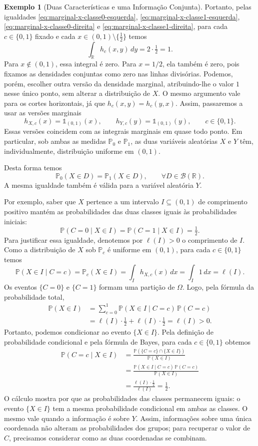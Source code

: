 \documentclass[12pt,portuguese]{article}
\theoremstyle{definition}
\newtheorem{example}[example]{Exemplo}
\theoremstyle{plainexercise}
\theoremstyle{starredexercise}
\theoremstyle{definition}
\begin{document}
\begin{example}[Duas Características e uma Informação Conjunta]
Portanto, pelas igualdades \eqref{eq:marginal-x-classe0-esquerda},
\eqref{eq:marginal-x-classe1-esquerda}, \eqref{eq:marginal-x-classe0-direita}
e \eqref{eq:marginal-x-classe1-direita}, para cada $c\in\{0,1\}$ fixado e
cada $x\in(0,1)\setminus\{\tfrac{1}{2}\}$ temos
\[
  \int_{\mathbb{R}}h_c(x,y)\,dy=2\cdot\tfrac{1}{2}=1.
\]
Para $x\notin(0,1)$, essa integral é zero. Para $x=1/2$, ela também é
zero, pois fixamos as densidades conjuntas como zero nas linhas divisórias.
Podemos, porém, escolher outra versão da densidade marginal, atribuindo-lhe
o valor $1$ nesse único ponto, sem alterar a distribuição de $X$.
O mesmo argumento vale para os cortes horizontais, já que
$h_c(x,y)=h_c(y,x)$. Assim, passaremos a usar as versões marginais
\[
  h_{X,c}(x)=\mathds{1}_{(0,1)}(x),
  \qquad
  h_{Y,c}(y)=\mathds{1}_{(0,1)}(y),
  \qquad c\in\{0,1\}.
\]
Essas versões coincidem com as integrais marginais em quase todo ponto.
Em particular, sob ambas as medidas $\mathbb{P}_0$ e $\mathbb{P}_1$,
as duas variáveis aleatórias $X$ e $Y$ têm, individualmente, distribuição uniforme em $(0,1)$.

Desta forma temos
\[
\mathbb{P}_0(X\in D)=\mathbb{P}_1(X\in D), \qquad \forall D\in\mathscr{B}(\mathbb{R}).
\] 
A mesma igualdade também é válida para a variável aleatória $Y$. 

Por exemplo, saber que $X$ pertence a um intervalo $I\subseteq(0,1)$ 
de comprimento positivo mantém as probabilidades das duas classes 
iguais às probabilidades iniciais:
\[
  \mathbb{P}(C=0\mid X\in I)
  =\mathbb{P}(C=1\mid X\in I)=\tfrac12.
\]
Para justificar essa igualdade, denotemos por $\ell(I)>0$ o comprimento de
$I$. Como a distribuição de $X$ sob $\mathbb{P}_c$ é uniforme em $(0,1)$,
para cada $c\in\{0,1\}$ temos
\[
  \mathbb{P}(X\in I\mid C=c)
  =\mathbb{P}_c(X\in I)
  =\int_I h_{X,c}(x)\,dx
  =\int_I 1\,dx=\ell(I).
\]
Os eventos $\{C=0\}$ e $\{C=1\}$ formam uma partição de $\Omega$.
Logo, pela fórmula da probabilidade total,
\begin{align*}
  \mathbb{P}(X\in I)
  &=\sum_{c=0}^{1}\mathbb{P}(X\in I\mid C=c)\,\mathbb{P}(C=c)
  \\[0.2cm]
  &=\ell(I)\cdot\tfrac12+\ell(I)\cdot\tfrac12
  =\ell(I)>0.
\end{align*}
Portanto, podemos condicionar ao evento $\{X\in I\}$. Pela definição de
probabilidade condicional e pela fórmula de Bayes, para cada
$c\in\{0,1\}$ obtemos
\begin{align*}
  \mathbb{P}(C=c\mid X\in I)
  &=\frac{\mathbb{P}(\{C=c\}\cap\{X\in I\})}{\mathbb{P}(X\in I)}
  \\[0.2cm]
  &=\frac{\mathbb{P}(X\in I\mid C=c)\,\mathbb{P}(C=c)}
    {\mathbb{P}(X\in I)}
  \\[0.2cm]
  &=\frac{\ell(I)\cdot\tfrac12}{\ell(I)}=\tfrac12.
\end{align*}
O cálculo mostra por que as probabilidades das classes permanecem iguais:
o evento $\{X\in I\}$ tem a mesma probabilidade condicional em ambas as
classes.
O mesmo vale quando a informação é sobre $Y$. Assim, informações sobre uma
única coordenada não alteram as probabilidades dos grupos; para recuperar
o valor de $C$, precisamos considerar como as duas coordenadas se combinam.


\end{example}
\end{document}
